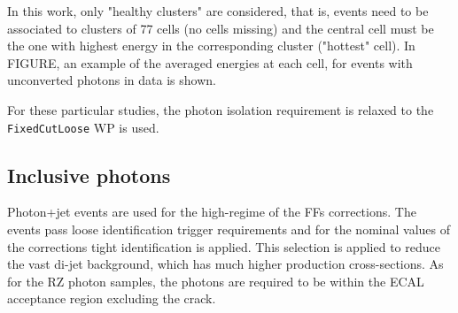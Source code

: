 In this work, only "healthy clusters" are considered, that is, events need to be associated to clusters of 77 cells (no cells missing) and the central cell must be the one with highest energy in the corresponding cluster ("hottest" cell). In FIGURE, an example of the averaged energies at each cell, for events with unconverted photons in data is shown.

For these particular studies, the photon isolation requirement is relaxed to the \texttt{FixedCutLoose} \ac{WP} is used.


\subsection{Inclusive photons}

Photon+jet events are used for the high-\pt regime of the \acp{FF} corrections. The events pass loose identification trigger requirements and for the nominal values of the corrections tight identification is applied. This selection is applied to reduce the vast di-jet background, which has much higher production cross-sections. As for the \ac{RZ} photon samples, the photons are required to be within the \ac{ECAL} acceptance region excluding the crack.